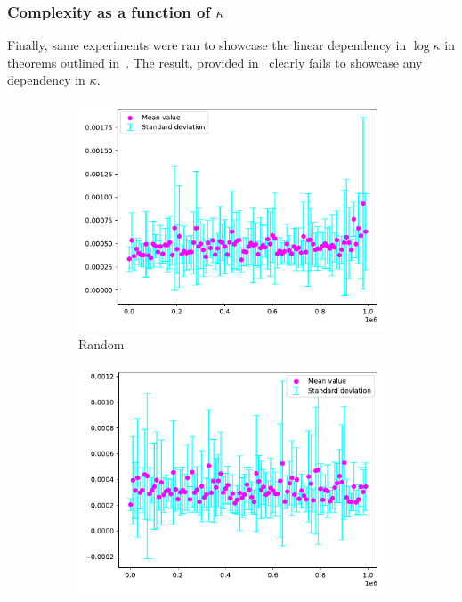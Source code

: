 \subsubsection{Complexity as a function of \(\kappa\)}

Finally, same experiments were ran to showcase the linear dependency in \(\log\kappa\) in theorems outlined in~. The result, provided in~ clearly fails to showcase any dependency in \(\kappa\).

\begin{figure}[H]
    \centering
    \begin{subfigure}[b]{.24\textwidth}
        \centering
        \includegraphics[width=\textwidth]{figures/kappa/random_function_of_kappa}
        \caption{Random.}\label{fig:kappaa}
    \end{subfigure}
    \hfill
    \begin{subfigure}[b]{.24\textwidth}
        \centering
        \includegraphics[width=\textwidth]{figures/kappa/random_cyclic_function_of_kappa}

\end{subfigure}
\end{figure}
